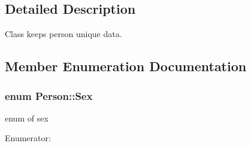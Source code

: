 \subsection{Detailed Description}
Class keeps person unique data. 

\subsection{Member Enumeration Documentation}
\hypertarget{classPerson_a328ea8d2e8c2674688c7f944fab70b6b}{
\subsubsection[{Sex}]{\setlength{\rightskip}{0pt plus 5cm}enum {\bf Person::Sex}}}
\label{d1/d63/classPerson_a328ea8d2e8c2674688c7f944fab70b6b}
enum of sex \begin{Desc}
\item[Enumerator: ]\par
\begin{description}
\item[{\em 
\hypertarget{classPerson_a328ea8d2e8c2674688c7f944fab70b6ba16691f7cc6595f87b71d9b43ad23fcb4}{
MALE}
\label{d1/d63/classPerson_a328ea8d2e8c2674688c7f944fab70b6ba16691f7cc6595f87b71d9b43ad23fcb4}
}]\item[{\em 
\hypertarget{classPerson_a328ea8d2e8c2674688c7f944fab70b6ba8ee21010fb2d8e8794ef72be368da064}{
FEMALE}
\label{d1/d63/classPerson_a328ea8d2e8c2674688c7f944fab70b6ba8ee21010fb2d8e8794ef72be368da064}
}]\end{description}
\end{Desc}



